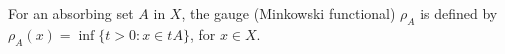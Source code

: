 For an absorbing set $A$ in $X$, the gauge (Minkowski functional) $\rho_A$ is defined by $\rho_A(x) = \inf\{t > 0 : x \in tA\}$, for $x \in X$.
